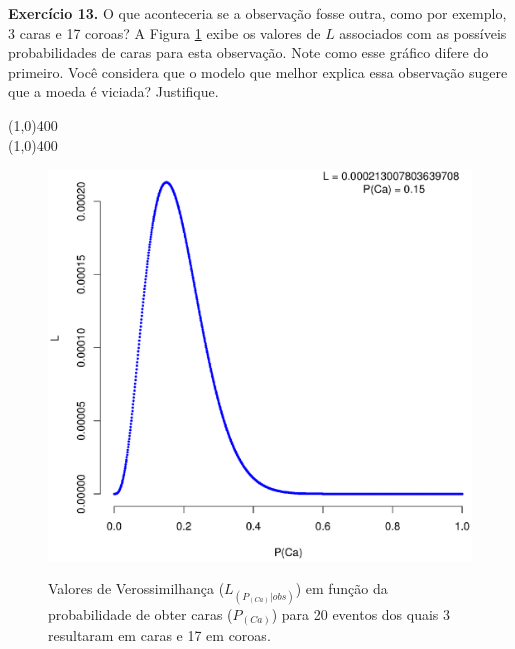 \begin{refsection}
\begin{blackBlock}{\textbf{Exercício 13.}}
O que aconteceria se a observação fosse outra, como por exemplo, 3 caras e 17 coroas? A Figura \ref{fig:plot2} exibe os valores de $L$ associados com as possíveis probabilidades de caras para esta observação. Note como esse gráfico difere do primeiro. Você considera que o modelo que melhor explica essa observação sugere que a moeda é viciada? Justifique.

\end{blackBlock}

\begin{center}
\line(1,0){400}\\
\line(1,0){400}\\
\end{center}

  \begin{figure}[h!]
       \centering
      {\includegraphics[scale=0.55]{figures/tut12/plot_2.eps}}
      {\caption{Valores de Verossimilhança ($L_{(P_{(Ca)}|obs)}$) em função da probabilidade de obter caras ($P_{(Ca)}$) para 20 eventos dos quais 3 resultaram em caras e 17 em coroas.}\label{fig:plot2}}
  \end{figure}



\end{refsection}
